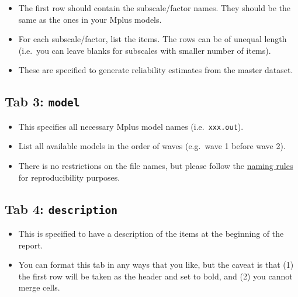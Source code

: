 \documentclass[
]{book}
\begin{document}
\begin{itemize}
\item
  The first row should contain the subscale/factor names. They should be the same as the ones in your Mplus models.
\item
  For each subscale/factor, list the items. The rows can be of unequal length (i.e.~you can leave blanks for subscales with smaller number of items).
\item
  These are specified to generate reliability estimates from the master dataset.
\end{itemize}

\hypertarget{tab-3-model}{%
\subsection{\texorpdfstring{Tab 3: \texttt{model}}{Tab 3: model}}\label{tab-3-model}}

\begin{itemize}
\item
  This specifies all necessary Mplus model names (i.e.~\texttt{xxx.out}).
\item
  List all available models in the order of waves (e.g.~wave 1 before wave 2).
\item
  There is no restrictions on the file names, but please follow the \href{https://nyu.box.com/s/ate5l7wmw164u7xjg3g8x1vrfhwnt0ax}{naming rules} for reproducibility purposes.
\end{itemize}

\hypertarget{tab-4-description}{%
\subsection{\texorpdfstring{Tab 4: \texttt{description}}{Tab 4: description}}\label{tab-4-description}}

\begin{itemize}
\item
  This is specified to have a description of the items at the beginning of the report.
\item
  You can format this tab in any ways that you like, but the caveat is that (1) the first row will be taken as the header and set to bold, and (2) you cannot merge cells.
\end{itemize}
\end{document}
